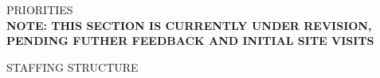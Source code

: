 \textcolor{ccorange}{PRIORITIES}
\\\textbf{NOTE: THIS SECTION IS CURRENTLY UNDER REVISION, PENDING FUTHER FEEDBACK AND INITIAL SITE VISITS}



\pagestyle{plain}
\whitetext{\Chapter{\textcolor{ccfuschia}{Staffing}}}
\pagecolor{ccfuschia}
\pagestyle{plain}

\pagebreak
{}
\pagestyle{fancy}
\fancyhf{}
\renewcommand{\chaptermark}[1]{\markboth{#1}{}}
\fancyfoot[LE,RO]{\sffamily\thepage}


\textcolor{ccfuschia}{STAFFING STRUCTURE}
